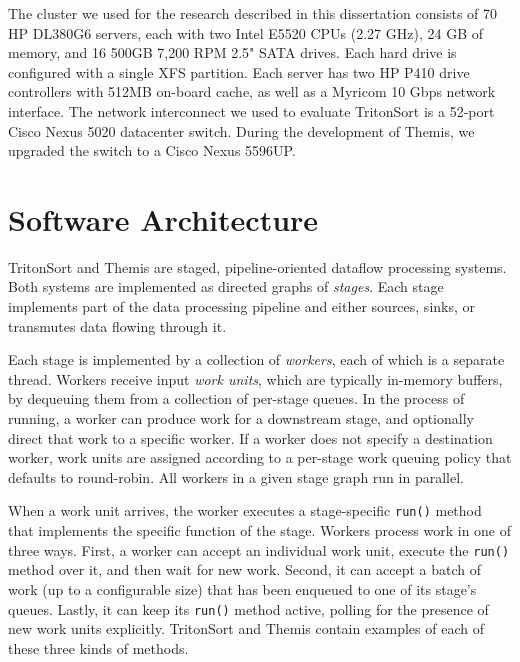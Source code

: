 The cluster we used for the research described in this dissertation consists of
70 HP DL380G6 servers, each with two Intel E5520 CPUs (2.27 GHz), 24 GB of
memory, and 16 500GB 7,200 RPM 2.5" SATA drives. Each hard drive is configured
with a single XFS partition. Each server has two HP P410 drive controllers with
512MB on-board cache, as well as a Myricom 10 Gbps network interface. The
network interconnect we used to evaluate TritonSort is a 52-port Cisco Nexus
5020 datacenter switch. During the development of Themis, we upgraded the
switch to a Cisco Nexus 5596UP.

\section{Software Architecture}

TritonSort and Themis are staged, pipeline-oriented dataflow processing
systems. Both systems are implemented as directed graphs of \emph{stages}. Each
stage implements part of the data processing pipeline and either sources,
sinks, or transmutes data flowing through it.

Each stage is implemented by a collection of \emph{workers}, each of which is a
separate thread. Workers receive input \emph{work units}, which are typically
in-memory buffers, by dequeuing them from a collection of per-stage queues. In
the process of running, a worker can produce work for a downstream stage, and
optionally direct that work to a specific worker. If a worker
does not specify a destination worker, work units are assigned according to a
per-stage work queuing policy that defaults to round-robin. All workers in a
given stage graph run in parallel.

When a work unit arrives, the worker executes a stage-specific \texttt{run()}
method that implements the specific function of the stage. Workers process work
in one of three ways. First, a worker can accept an individual work unit,
execute the \texttt{run()} method over it, and then wait for new work. Second,
it can accept a batch of work (up to a configurable size) that has been
enqueued to one of its stage's queues. Lastly, it can keep its \texttt{run()}
method active, polling for the presence of new work units
explicitly. TritonSort and Themis contain examples of each of these three kinds
of methods.


